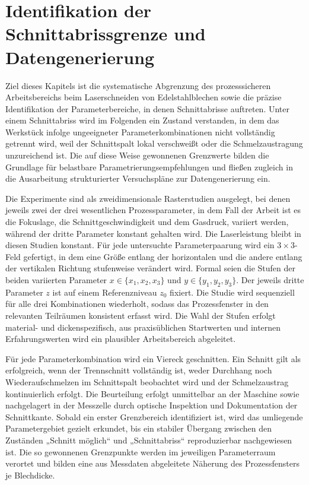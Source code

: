 \chapter{Identifikation der Schnittabrissgrenze und Datengenerierung}

Ziel dieses Kapitels ist die systematische Abgrenzung des prozesssicheren Arbeitsbereichs beim Laserschneiden von Edelstahlblechen sowie die präzise Identifikation der Parameterbereiche, in denen Schnittabrisse auftreten. Unter einem Schnittabriss wird im Folgenden ein Zustand verstanden, in dem das Werkstück infolge ungeeigneter Parameterkombinationen nicht vollständig getrennt wird, weil der Schnittspalt lokal verschweißt oder die Schmelzaustragung unzureichend ist. Die auf diese Weise gewonnenen Grenzwerte bilden die Grundlage für belastbare Parametrierungsempfehlungen und fließen zugleich in die Ausarbeitung strukturierter Versuchspläne zur Datengenerierung ein.

Die Experimente sind als zweidimensionale Rasterstudien ausgelegt, bei denen jeweils zwei der drei wesentlichen Prozessparameter, in dem Fall der Arbeit ist es die Fokuslage, die Schnittgeschwindigkeit und dem Gasdruck, variiert werden, während der dritte Parameter konstant gehalten wird. Die Laserleistung bleibt in diesen Studien konstant. Für jede untersuchte Parameterpaarung wird ein $3\times 3$-Feld gefertigt, in dem eine Größe entlang der horizontalen und die andere entlang der vertikalen Richtung stufenweise verändert wird. Formal seien die Stufen der beiden variierten Parameter $x\in\{x_1,x_2,x_3\}$ und $y\in\{y_1,y_2,y_3\}$. Der jeweils dritte Parameter $z$ ist auf einem Referenzniveau $z_0$ fixiert. Die Studie wird sequenziell für alle drei Kombinationen wiederholt, sodass das Prozessfenster in den relevanten Teilräumen konsistent erfasst wird. Die Wahl der Stufen erfolgt material- und dickenspezifisch, aus praxisüblichen Startwerten und internen Erfahrungswerten wird ein plausibler Arbeitsbereich abgeleitet.

Für jede Parameterkombination wird ein Viereck geschnitten. Ein Schnitt gilt als erfolgreich, wenn der Trennschnitt vollständig ist, weder Durchhang noch Wiederaufschmelzen im Schnittspalt beobachtet wird und der Schmelzaustrag kontinuierlich erfolgt. Die Beurteilung erfolgt unmittelbar an der Maschine sowie nachgelagert in der Messzelle durch optische Inspektion und Dokumentation der Schnittkante. Sobald ein erster Grenzbereich identifiziert ist, wird das umliegende Parametergebiet gezielt erkundet, bis ein stabiler Übergang zwischen den Zuständen „Schnitt möglich“ und „Schnittabriss“ reproduzierbar nachgewiesen ist. Die so gewonnenen Grenzpunkte werden im jeweiligen Parameterraum verortet und bilden eine aus Messdaten abgeleitete Näherung des Prozessfensters je Blechdicke.

